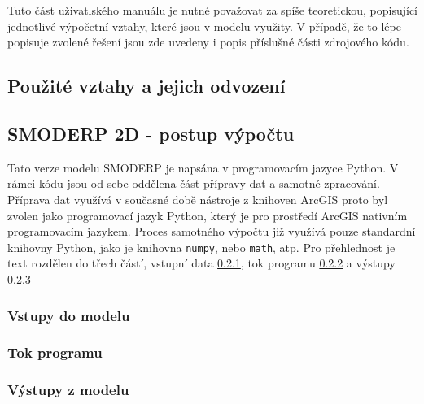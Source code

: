 %

Tuto část uživatlského manuálu je nutné považovat za spíše teoretickou, popisující jednotlivé výpočetní vztahy, které jsou v modelu využity. V případě, že to lépe popisuje zvolené řešení jsou zde uvedeny i popis příslušné části zdrojového kódu.


\subsection{Použité vztahy a jejich odvození} \label{modelovani}


	


\subsection{SMODERP 2D - postup výpočtu} \label{vypocet}
Tato verze modelu SMODERP je napsána v programovacím jazyce Python. V rámci kódu jsou od sebe oddělena část přípravy dat a samotné zpracování.
Příprava dat využívá v současné době nástroje z knihoven ArcGIS proto byl zvolen jako programovací jazyk Python, který je pro prostředí ArcGIS nativním programovacím jazykem. Proces samotného výpočtu již využívá pouze standardní knihovny Python, jako je knihovna \texttt{numpy}, nebo \texttt{math}, atp. Pro přehlednost je text rozdělen do třech částí, vstupní data \ref{kap:vstupy}, tok programu \ref{kap:tok} a výstupy \ref{kap:vystupy}

%	
		
	
	\subsubsection{Vstupy do modelu} \label{kap:vstupy}
	 
	
	\subsubsection{Tok programu} \label{kap:tok}
	
	
	\subsubsection{Výstupy z modelu} \label{kap:vystupy}
	

